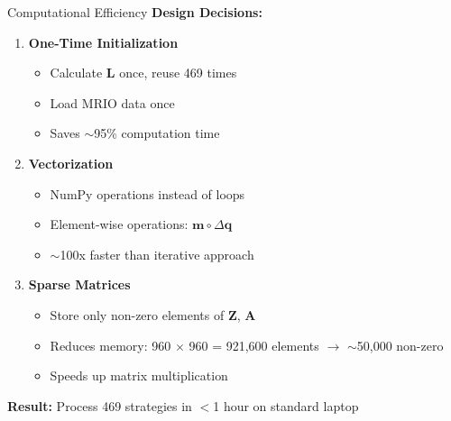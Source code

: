 \documentclass[10pt]{beamer}
\begin{document}
\begin{frame}{Computational Efficiency}
\textbf{Design Decisions:}

\vspace{0.3cm}

\begin{enumerate}
    \item \textbf{One-Time Initialization}
    \begin{itemize}
        \item Calculate $\mathbf{L}$ once, reuse 469 times
        \item Load MRIO data once
        \item Saves $\sim$95\% computation time
    \end{itemize}

    \vspace{0.2cm}

    \item \textbf{Vectorization}
    \begin{itemize}
        \item NumPy operations instead of loops
        \item Element-wise operations: $\mathbf{m} \circ \Delta\mathbf{q}$
        \item $\sim$100x faster than iterative approach
    \end{itemize}

    \vspace{0.2cm}

    \item \textbf{Sparse Matrices}
    \begin{itemize}
        \item Store only non-zero elements of $\mathbf{Z}$, $\mathbf{A}$
        \item Reduces memory: 960 $\times$ 960 = 921,600 elements $\rightarrow$ $\sim$50,000 non-zero
        \item Speeds up matrix multiplication
    \end{itemize}
\end{enumerate}

\vspace{0.3cm}

\textbf{Result:} Process 469 strategies in $<$1 hour on standard laptop
\end{frame}

\end{document}
